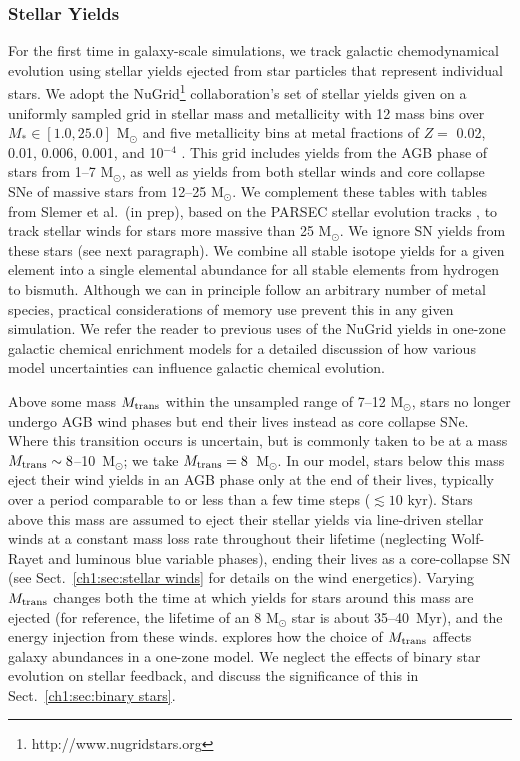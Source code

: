 \subsubsection{Stellar Yields}
\label{ch1:sec:yields}
For the first time in galaxy-scale simulations, we track galactic chemodynamical evolution using stellar yields ejected from star particles that represent individual stars. We adopt the NuGrid\footnote{http://www.nugridstars.org} collaboration's set of stellar yields given on a uniformly sampled grid in stellar mass and metallicity with 12 mass bins over $M_{*} \in \left[1.0, 25.0\right]$ M$_{\odot}$ and five metallicity bins at metal fractions of $Z =$ 0.02, 0.01, 0.006, 0.001, and 10$^{-4}$ \citep{Pignatari2016, Ritter2018}. This grid includes yields from the AGB phase of stars from 1--7 M$_{\odot}$, as well as yields from both stellar winds and core collapse SNe of massive stars from 12--25 M$_{\odot}$. We complement these tables with tables from Slemer et al.\ (in prep), based on the PARSEC stellar evolution tracks \citep{Bressan2012, Tang2014}, to track stellar winds for stars more massive than 25 M$_{\odot}$. We ignore SN yields from these stars (see next paragraph). We combine all stable isotope yields for a given element into a single elemental abundance for all stable elements from hydrogen to bismuth. Although we can in principle follow an arbitrary number of metal species, practical considerations of memory use prevent this in any given simulation. We refer the reader to previous uses of the NuGrid yields in one-zone galactic chemical enrichment models \citep{Cote2016,  Cote2016_feb,Cote2017a} for a detailed discussion of how various model uncertainties can influence galactic chemical evolution.

%
%

Above some mass $M_{\rm trans}$ within the unsampled range of 7--12 M$_{\odot}$, stars no longer undergo AGB wind phases but end their lives instead as core collapse SNe. Where this transition occurs is uncertain, but is commonly taken to be at a mass $M_{\rm trans} \sim 8$--10~M$_{\odot}$; we take $M_{\rm trans} = 8$~M$_{\odot}$. In our model, stars below this mass eject their wind yields in an AGB phase only at the end of their lives, typically over a period comparable to or less than a few time steps ($\lesssim 10$ kyr). Stars above this mass are assumed to eject their stellar yields via line-driven stellar winds at a constant mass loss rate throughout their lifetime (neglecting Wolf-Rayet and luminous blue variable phases), ending their lives as a core-collapse SN (see Sect.~\ref{ch1:sec:stellar winds} for details on the wind energetics). Varying $M_{\rm trans}$ changes both the time at which yields for stars around this mass are ejected (for reference, the lifetime of an 8 M$_{\odot}$ star is about 35--40~Myr), and the energy injection from these winds. \citet{Cote2017a} explores how the choice of $M_{\rm trans}$ affects galaxy abundances in a one-zone model. We neglect the effects of binary star evolution on stellar feedback, and discuss the significance of this in Sect.~\ref{ch1:sec:binary stars}.

